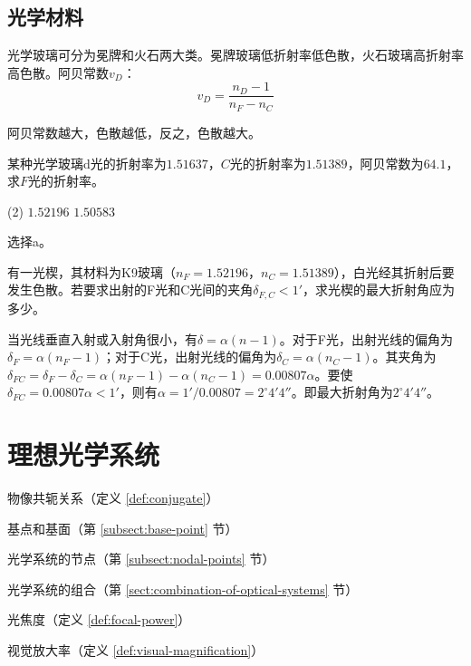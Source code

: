\documentclass[cn,10pt,chinesefont=founder,math=newtx,cite=super,twoside]{elegantbook}
\begin{document}
\section{光学材料}
\label{sect:optical-material}
光学玻璃可分为冕牌和火石两大类。冕牌玻璃低折射率低色散，火石玻璃高折射率高色散。阿贝常数$v_D$：
\begin{equation}
v_D=\frac{n_D-1}{n_F-n_C}
\end{equation}

\begin{property}
	阿贝常数越大，色散越低，反之，色散越大。
\end{property}

\begin{problem}
	某种光学玻璃d光的折射率为$1.51637$，$C$光的折射率为$1.51389$，阿贝常数为$64.1$，求$F$光的折射率。
	\begin{tasks}(2)
		\task $1.52196$
		\task $1.50583$
	\end{tasks}
\end{problem}
\begin{solution}
	选择a。
\end{solution}

\begin{problem}
	有一光楔，其材料为K9玻璃（$n_F=1.52196$，$n_C=1.51389$），白光经其折射后要发生色散。若要求出射的F光和C光间的夹角$\delta_{F,C}<1'$，求光楔的最大折射角应为多少。
\end{problem}
\begin{solution}
	当光线垂直入射或入射角很小，有$\delta=\alpha(n-1)$。对于F光，出射光线的偏角为$\delta_F=\alpha(n_F-1)$；对于C光，出射光线的偏角为$\delta_C=\alpha(n_C-1)$。其夹角为$\delta_{FC}=\delta_F-\delta_C=\alpha(n_F-1)-\alpha(n_C-1)=0.00807\alpha$。要使$\delta_{FC}=0.00807\alpha<1'$，则有$\alpha=1'/0.00807=2^{\circ}4'4''$。即最大折射角为$2^{\circ}4'4''$。
\end{solution}

\chapter{理想光学系统}

\begin{introduction}
	\item 物像共轭关系（定义 \ref{def:conjugate}）
	\item 基点和基面（第 \ref{subsect:base-point} 节）
	\item 光学系统的节点（第 \ref{subsect:nodal-points} 节）
	\item 光学系统的组合（第 \ref{sect:combination-of-optical-systems} 节）
	\item 光焦度（定义 \ref{def:focal-power}）
	\item 视觉放大率（定义 \ref{def:visual-magnification}）
\end{introduction}
\end{document}
